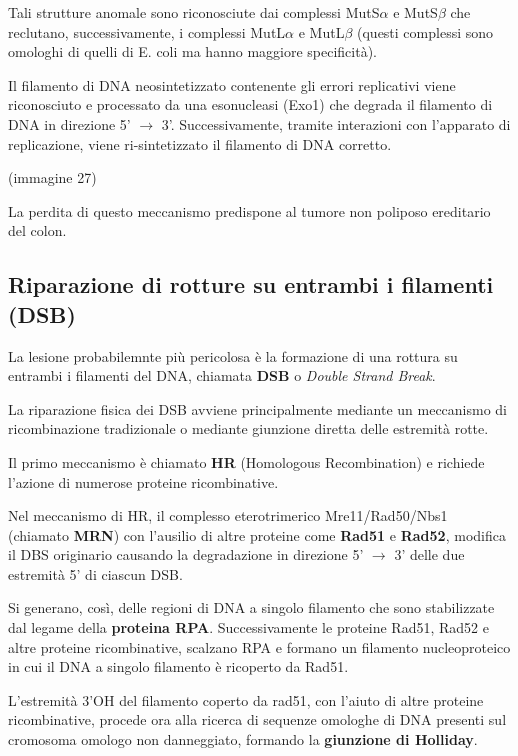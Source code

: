 \documentclass[11pt]{book}
\begin{document}
Tali strutture anomale sono riconosciute dai complessi MutS\(\alpha\) e
MutS\(\beta\) che reclutano, successivamente, i complessi MutL\(\alpha\)
e MutL\(\beta\) (questi complessi sono omologhi di quelli di E. coli ma
hanno maggiore specificità).

Il filamento di DNA neosintetizzato contenente gli errori replicativi
viene riconosciuto e processato da una esonucleasi (Exo1) che degrada il
filamento di DNA in direzione 5' \(\rightarrow\) 3'. Successivamente,
tramite interazioni con l'apparato di replicazione, viene
ri-sintetizzato il filamento di DNA corretto.

(immagine 27)

La perdita di questo meccanismo predispone al tumore non poliposo
ereditario del colon.

\subsection{Riparazione di rotture su entrambi i filamenti
(DSB)}\label{riparazione-di-rotture-su-entrambi-i-filamenti-dsb}

La lesione probabilemnte più pericolosa è la formazione di una rottura
su entrambi i filamenti del DNA, chiamata \textbf{DSB} o \emph{Double
Strand Break}.

La riparazione fisica dei DSB avviene principalmente mediante un
meccanismo di ricombinazione tradizionale o mediante giunzione diretta
delle estremità rotte.

Il primo meccanismo è chiamato \textbf{HR} (Homologous Recombination) e
richiede l'azione di numerose proteine ricombinative.

Nel meccanismo di HR, il complesso eterotrimerico Mre11/Rad50/Nbs1
(chiamato \textbf{MRN}) con l'ausilio di altre proteine come
\textbf{Rad51} e \textbf{Rad52}, modifica il DBS originario causando la
degradazione in direzione 5' \(\rightarrow\) 3' delle due estremità 5'
di ciascun DSB.

Si generano, così, delle regioni di DNA a singolo filamento che sono
stabilizzate dal legame della \textbf{proteina RPA}. Successivamente le
proteine Rad51, Rad52 e altre proteine ricombinative, scalzano RPA e
formano un filamento nucleoproteico in cui il DNA a singolo filamento è
ricoperto da Rad51.

L'estremità 3'OH del filamento coperto da rad51, con l'aiuto di altre
proteine ricombinative, procede ora alla ricerca di sequenze omologhe di
DNA presenti sul cromosoma omologo non danneggiato, formando la
\textbf{giunzione di Holliday}.
\end{document}
